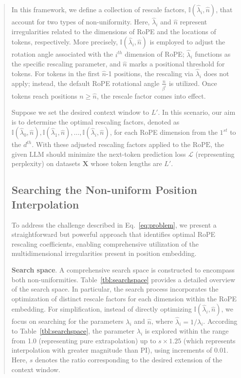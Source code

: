 \begin{abstract}
In this framework, we define a collection of rescale factors, $\mathbb{I}(\hat{\lambda}_{i},\hat{n})$, that account for two types of non-uniformity. Here, $\hat{\lambda}_i$ and $\hat{n}$ represent irregularities related to the dimensions of RoPE and the locations of tokens, respectively. More precisely, $\mathbb{I}(\hat{\lambda}_{i},\hat{n})$ is employed to adjust the rotation angle associated with the $i^{th}$ dimension of RoPE; $\hat{\lambda}_i$ functions as the specific rescaling parameter, and $\hat{n}$ marks a positional threshold for tokens. For tokens in the first $\hat{n}$-1 positions, the rescaling via $\hat{\lambda}_i$ does not apply; instead, the default RoPE rotational angle $\frac{n}{\beta^i}$ is utilized. Once tokens reach positions $n\ge\hat{n}$, the rescale factor comes into effect.

Suppose we set the desired context window to $L'$. In this scenario, our aim is to determine the optimal rescaling factors, denoted as $\mathbb{I}(\hat{\lambda}_{0},\hat{n}), \mathbb{I}(\hat{\lambda}_{1},\hat{n}), \ldots, \mathbb{I}(\hat{\lambda}_{i},\hat{n})$, for each RoPE dimension from the $1^{st}$ to the $d^{th}$. With these adjusted rescaling factors applied to the $\text{RoPE}$, the given $\text{LLM}$ should minimize the next-token prediction loss $\mathcal{L}$ (representing perplexity) on datasets $\mathbf{X}$ whose token lengths are $L'$.

\subsection{Searching the Non-uniform Position Interpolation}

To address the challenge described in Eq.~\ref{eq:problem}, we present a straightforward but powerful approach that identifies optimal RoPE rescaling coefficients, enabling comprehensive utilization of the multidimensional irregularities present in position embedding.

\textbf{Search space}. A comprehensive search space is constructed to encompass both non-uniformities. Table~\ref{tbl:searchspace} provides a detailed overview of the search space. In particular, the search process incorporates the optimization of distinct rescale factors for each dimension within the RoPE embedding. For simplification, instead of directly optimizing $\mathbb{I}(\hat{\lambda}_{i},\hat{n})$, we focus on searching for the parameters $\lambda_i$ and $\hat{n}$, where $\hat{\lambda}_{i}=1/\lambda_i$. According to Table~\ref{tbl:searchspace}, the parameter $\lambda_i$ is explored within the range from 1.0 (representing pure extrapolation) up to $s\times1.25$ (which represents interpolation with greater magnitude than PI), using increments of 0.01. Here, $s$ denotes the ratio corresponding to the desired extension of the context window.


\end{abstract}
